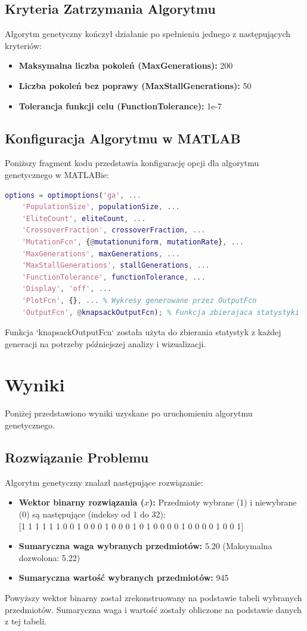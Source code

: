 \documentclass[a4paper, 11pt]{article}
\begin{document}
\subsection{Kryteria Zatrzymania Algorytmu}
Algorytm genetyczny kończył działanie po spełnieniu jednego z następujących kryteriów:
\begin{itemize}
    \item \textbf{Maksymalna liczba pokoleń (MaxGenerations):} 200
    \item \textbf{Liczba pokoleń bez poprawy (MaxStallGenerations):} 50
    \item \textbf{Tolerancja funkcji celu (FunctionTolerance):} 1e-7
\end{itemize}

\subsection{Konfiguracja Algorytmu w MATLAB}
Poniższy fragment kodu przedstawia konfigurację opcji dla algorytmu genetycznego w MATLABie:
\begin{lstlisting}[language=Matlab, caption={Konfiguracja opcji algorytmu genetycznego w MATLAB}, label={lst:ga_options}]
options = optimoptions('ga', ...
    'PopulationSize', populationSize, ...
    'EliteCount', eliteCount, ...
    'CrossoverFraction', crossoverFraction, ...
    'MutationFcn', {@mutationuniform, mutationRate}, ...
    'MaxGenerations', maxGenerations, ...
    'MaxStallGenerations', stallGenerations, ...
    'FunctionTolerance', functionTolerance, ...
    'Display', 'off', ...
    'PlotFcn', {}, ... % Wykresy generowane przez OutputFcn
    'OutputFcn', @knapsackOutputFcn); % Funkcja zbierajaca statystyki
\end{lstlisting}
Funkcja `knapsackOutputFcn` została użyta do zbierania statystyk z każdej generacji na potrzeby późniejszej analizy i wizualizacji.

\newpage
\section{Wyniki}
Poniżej przedstawiono wyniki uzyskane po uruchomieniu algorytmu genetycznego.

\subsection{Rozwiązanie Problemu}
Algorytm genetyczny znalazł następujące rozwiązanie:
\begin{itemize}
    \item \textbf{Wektor binarny rozwiązania ($x$):}
    Przedmioty wybrane (1) i niewybrane (0) są następujące (indeksy od 1 do 32):\\
    {[1 1 1 1 1 1 0 0 1 0 0 0 1 0 0 0 1 0 1 0 0 0 0 1 0 0 0 0 1 0 0 1]}
    \item \textbf{Sumaryczna waga wybranych przedmiotów:} 5.20 (Maksymalna dozwolona: 5.22)
    \item \textbf{Sumaryczna wartość wybranych przedmiotów:} 945
\end{itemize}
Powyższy wektor binarny został zrekonstruowany na podstawie tabeli wybranych przedmiotów. Sumaryczna waga i wartość zostały obliczone na podstawie danych z tej tabeli.
\end{document}
